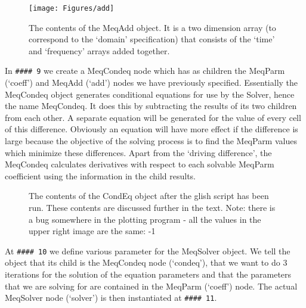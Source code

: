 \documentclass[10pt]{article}
\begin{document}
\begin{figure}
{\par\centering
\texttt{[image: Figures/add]}
\par}
\caption {The contents of the MeqAdd object. It is a two dimension array (to
correspond to the `domain' specification) that consists of the `time' and
`frequency' arrays added together.}
\label{fig:add}
\end{figure}

In {\tt \#\#\#\# 9} we create a MeqCondeq node which has as 
children the MeqParm (`coeff') and MeqAdd (`add') nodes we have 
previously specified. Essentially the MeqCondeq object generates conditional
equations for use by the Solver, hence the name MeqCondeq. It does this
by subtracting the results of its two children from each other. A separate
equation will be generated for the value of every cell of this difference.
Obviously an equation will have more effect if the difference is large
because the objective of the solving process is to find the MeqParm
values which minimize these differences. Apart from the `driving difference',
the MeqCondeq calculates derivatives with respect to each solvable
MeqParm coefficient using the information in the child results.

\begin{figure}
{\par\centering
{}
\par}
\caption {The contents of the CondEq object after the glish script
has been run. These contents are discussed further 
in the text. Note: there is a bug somewhere in the plotting program -
all the values in the upper right image are the same: -1}
\label{fig:condeq}
\end{figure}

At {\tt \#\#\#\# 10} we define various parameter for the MeqSolver object.
We tell the object that its child is the MeqCondeq node (`condeq'), that
we want to do 3 iterations for the solution of the equation parameters
and that the parameters that we are solving for are contained
in the MeqParm (`coeff') node. The actual MeqSolver node (`solver') is
then instantiated at {\tt \#\#\#\# 11}. 
\end{document}
